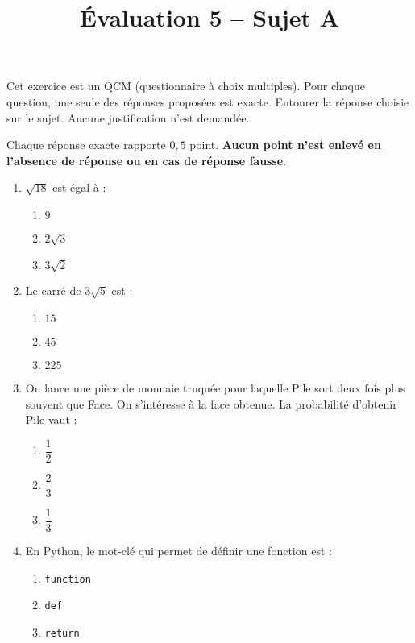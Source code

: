 \documentclass[a4paper,dvipsnames]{article}
\begin{document}
\title{Évaluation 5 -- Sujet A}
\author{}
\date{}

\maketitle{}

\pagestyle{empty}

\exo[2 points]\vspace{-2mm} 
Cet exercice est un QCM (questionnaire à choix multiples). Pour chaque question, une seule des réponses proposées est exacte. Entourer la réponse choisie sur le sujet. Aucune justification n'est demandée.

\smallskip

Chaque réponse exacte rapporte $0,5$ point. \textbf{Aucun point n’est enlevé en l’absence de réponse ou en cas de réponse fausse}.

\begin{enumerate}
  \item $\sqrt{18}$ est égal à :
    \begin{multicols}{3}
      \begin{enumerate}
	\item $9$
	\item $2\sqrt{3}$
	\item $3\sqrt{2}$
      \end{enumerate}
    \end{multicols}
  \item Le carré de $3\sqrt{5}$ est :
    \begin{multicols}{3}
      \begin{enumerate}
	\item $15$
	\item $45$
	\item $225$
      \end{enumerate}
    \end{multicols}
  \item On lance une pièce de monnaie truquée pour laquelle \og{}Pile\fg{} sort deux fois plus souvent que \og{}Face\fg{}. On s'intéresse à la face obtenue. La probabilité d'obtenir \og{}Pile\fg{} vaut :
    \begin{multicols}{3}
      \begin{enumerate}
	\item $\dfrac{1}{2}$
	\item $\dfrac{2}{3}$
	\item $\dfrac{1}{3}$
      \end{enumerate}
    \end{multicols}
  \item En Python, le mot-clé qui permet de définir une fonction est :
    \begin{multicols}{3}
      \begin{enumerate}
	\item \texttt{function}
	\item \texttt{def}
	\item \texttt{return}
      \end{enumerate}
    \end{multicols}
\end{enumerate}
\end{document}
